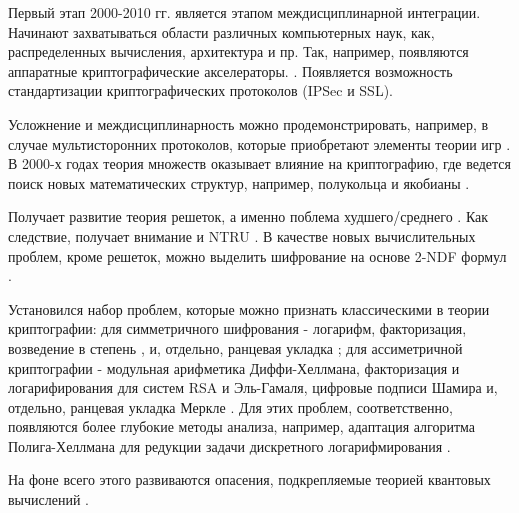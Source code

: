      \color{Red}Первый этап 2000-2010 гг. является этапом междисциплинарной интеграции. Начинают захватываться области  различных компьютерных наук, как, распределенных вычисления, архитектура и пр. Так, например, появляются аппаратные криптографические акселераторы. \cite{Advances Crypto-07}. Появляется возможность стандартизации криптографических протоколов (IPSec и SSL).\par
     \color{LimeGreen}Усложнение и междисциплинарность можно продемонстрировать, например, в случае мультисторонних протоколов, которые приобретают элементы теории игр \cite{KatzGameTheory-08} \cite{HeindlMultivariate-09}. В 2000-х годах теория множеств оказывает влияние на криптографию, где ведется поиск новых математических структур, например, полукольца \cite{MonicoSemiRings-02} и якобианы \cite{GeneralizedJacobians-06}.\par
     Получает развитие теория решеток, а именно поблема худшего/среднего \cite{PeikertCollisionResistant-06} \cite{PeikertLatticesLog-07} \cite{MicciancioWorstCase-02} \cite{MultiBitLattice-07}. Как следствие, получает внимание и NTRU \cite{PhilipChoosingNTRU-09}\cite{NickHybridNTRUAttack-07}. В качестве новых вычислительных проблем, кроме решеток, можно выделить шифрование на основе 2-NDF формул \cite{2DNF-05}.\par
     Установился набор проблем, которые можно признать классическими в теории криптографии: для симметричного шифрования - логарифм, факторизация, возведение в степень \cite{RSA} \cite{ElGamal}, и, отдельно, ранцевая укладка \cite{LyubashevskyKnapsacks-06} \cite{MicciancioKnapsacks-07}; для ассиметричной криптографии -  модульная арифметика Диффи-Хеллмана, факторизация и логарифирования для систем RSA и Эль-Гамаля, цифровые подписи Шамира и, отдельно, ранцевая укладка Меркле \cite{HellmanOverview-02}. Для этих проблем, соответственно, появляются более глубокие методы анализа, например, адаптация алгоритма Полига-Хеллмана для редукции задачи дискретного логарифмирования \cite{MonicoSemiRings-02}.\par
     На фоне всего этого развиваются опасения, подкрепляемые теорией квантовых вычислений \cite{BarrenoQuantumFuture-02}.\par
